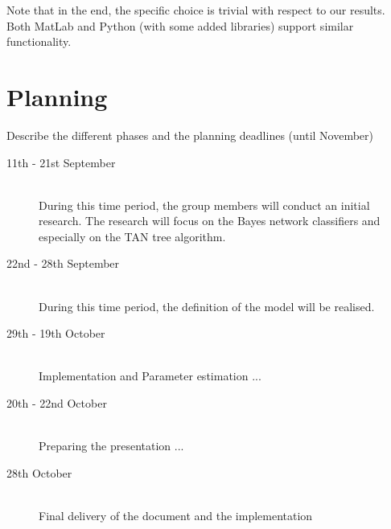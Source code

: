\documentclass[a4paper, 11pt]{scrartcl}
\begin{document}
Note that in the end, the specific choice is trivial with respect to our results. Both MatLab and Python (with some added libraries) support similar functionality.

\section{Planning}

Describe the different phases and the planning deadlines (until November)

\begin{description}
	\item[11th - 21st September]\-\\
	During this time period, the group members will conduct an initial research. The research will focus on the Bayes network classifiers and especially on the TAN tree algorithm.
	\item[22nd - 28th September]\-\\
	During this time period, the definition of the model will be realised. \cite{CV:2009kl}
	\item[29th - 19th October]\-\\
	Implementation and Parameter estimation ...
	\item[20th - 22nd October]\-\\
	Preparing the presentation ...
	\item[28th October]\-\\
	Final delivery of the document and the implementation
\end{description}

\nocite{*} %


\end{document}
